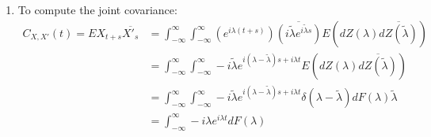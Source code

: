 \documentclass[12pt]{article}
\theoremstyle{plain}
\theoremstyle{definition}
\theoremstyle{remark}
\begin{document}
\begin{enumerate}
\begin{enumerate}
      \item To compute the joint covariance:
        \begin{align*}
          C_{X,X'}(t) = EX_{t+s}\overline{X'_s}
            &= \int^\infty_{-\infty} \int^\infty_{-\infty}
            \left(e^{i\lambda (t+s)}\right)
            \overline{\left(i\tilde{\lambda} e^{i\tilde{\lambda} s}\right)}
            E(dZ(\lambda)\overline{dZ(\tilde{\lambda})}) \\
          &= \int^\infty_{-\infty} \int^\infty_{-\infty}
            -i\tilde{\lambda} e^{i(\lambda-\tilde{\lambda}) s +{i\lambda}t}
            E(dZ(\lambda)\overline{dZ(\tilde{\lambda})}) \\
          &= \int^\infty_{-\infty} \int^\infty_{-\infty}
            -i\tilde{\lambda} e^{i(\lambda-\tilde{\lambda}) s +{i\lambda}t}
            \delta(\lambda-\tilde{\lambda}) dF(\lambda)\tilde{\lambda}\\
          &= \int^\infty_{-\infty} 
            -i{\lambda} e^{{i\lambda}t}
            dF(\lambda)
        \end{align*}

    \end{enumerate}

\end{enumerate}



\end{document}

